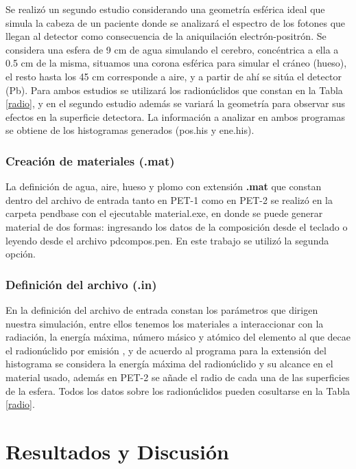\documentclass[12pt,a4paper,onecolumn]{article}
\begin{document}
Se realizó un segundo estudio considerando una geometría esférica ideal que simula la cabeza de un paciente donde se analizará el espectro de los fotones que llegan al detector como consecuencia de la aniquilación electrón-positrón. Se considera una esfera de 9 cm de agua simulando el cerebro, concéntrica a ella a 0.5 cm de la misma, situamos una corona esférica para simular el cráneo (hueso), el resto hasta los 45 cm corresponde a aire, y a partir de ahí se sitúa el detector (Pb). Para ambos estudios se utilizará los radionúclidos que constan en la Tabla \ref{radio}, y en el segundo estudio además se variará la geometría para observar sus efectos en la superficie detectora. La información a analizar en ambos programas se obtiene de los histogramas generados (pos.his y ene.his).

\subsubsection*{Creación de materiales (.mat)}
La definición de agua, aire, hueso y plomo con extensión \textbf{.mat} que constan dentro del archivo de entrada tanto en PET-1 como en PET-2 se realizó en la carpeta pendbase con el ejecutable material.exe, en donde se puede generar material de dos formas: ingresando los datos de la composición desde el teclado o leyendo desde el archivo pdcompos.pen. En este trabajo se utilizó la segunda opción.

\subsubsection*{Definición del archivo (.in)}
En la definición del archivo de entrada constan los parámetros que dirigen nuestra simulación, entre ellos tenemos los materiales a interaccionar con la radiación, la energía máxima, número másico y atómico del elemento al que decae el radionúclido por emisión \ce{\beta^+}, y de acuerdo al programa para la extensión del histograma se considera la energía máxima del radionúclido y su alcance en el material usado, además en PET-2 se añade el radio de cada una de las superficies de la esfera. Todos los datos sobre los radionúclidos pueden cosultarse en la Tabla \ref{radio}.

\section{Resultados y Discusión}
\end{document}
